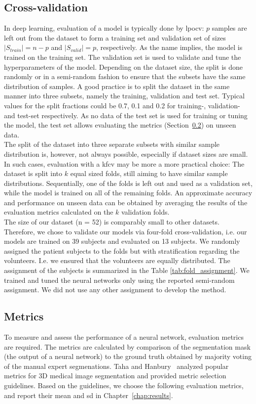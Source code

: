 \subsection{Cross-validation} \label{sec:eval_cross}
In deep learning, evaluation of a model is typically done by \gls{lpocv}: $p$ samples are left out from the dataset to form a training set and validation set of sizes $|S_{train}| = n - p$ and $|S_{valid}| = p$, respectively. As the name implies, the model is trained on the training set. The validation set is used to validate and tune the hyperparameters of the model.
Depending on the dataset size, the split is done randomly or in a semi-random fashion to ensure that the subsets have the same distribution of samples.
A good practice is to split the dataset in the same manner into three subsets, namely the training, validation and test set. Typical values for the split fractions could be 0.7, 0.1 and 0.2 for training-, validation- and test-set respectively. As no data of the test set is used for training or tuning the model, the test set allows evaluating the metrics (Section~\ref{sec:eval_metrics}) on unseen data. \\
The split of the dataset into three separate subsets with similar sample distribution is, however, not always possible, especially if dataset sizes are small. In such cases, evaluation with a \gls{kfcv} may be more a more practical choice: The dataset is split into $k$ equal sized folds, still aiming to have similar sample distributions. Sequentially, one of the folds is left out and used as a validation set, while the model is trained on all of the remaining folds. An approximate accuracy and performance on unseen data can be obtained by averaging the results of the evaluation metrics calculated on the $k$ validation folds.\\
The size of our dataset (n = 52) is comparably small to other datasets. Therefore, we chose to validate our models via four-fold cross-validation, i.e. our models are trained on 39 subjects and evaluated on 13 subjects. We randomly assigned the patient subjects to the folds but with stratification regarding the volunteers. I.e. we ensured that the volunteers are equally distributed. The assignment of the subjects is summarized in the Table \ref{tab:fold_assignment}. We trained and tuned the neural networks only using the reported semi-random assignment. We did not use any other assignment to develop the method.

\subsection{Metrics} \label{sec:eval_metrics}
To measure and assess the performance of a neural network, evaluation metrics are required. The metrics are calculated by comparison of the segmentation mask (the output of a neural network) to the ground truth obtained by majority voting of the manual expert segmenations. Taha and Hanbury~\cite{Taha2015MetricsTool} analyzed popular metrics for 3D medical image segmentation and provided metric selection guidelines. Based on the guidelines, we choose the following evaluation metrics, and report their mean and \gls{sd} in Chapter~\ref{chap:results}.

